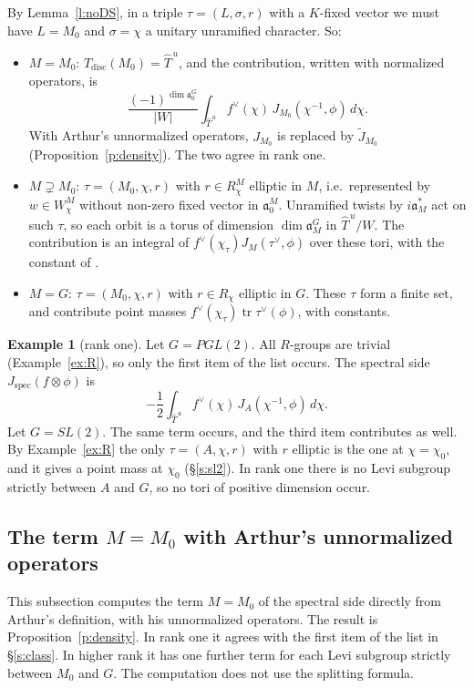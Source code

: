 \documentclass[12pt,letterpaper]{article}
\numberwithin{equation}{section}
\theoremstyle{plain}
\theoremstyle{definition}
\newtheorem{example}[theorem]{Example}
\theoremstyle{remark}
\newcommand{\fa}{\mathfrak{a}}
\newcommand{\Thu}{\widehat{T}^{\,u}}
\DeclareMathOperator{\tr}{tr}
\newcommand{\Tdisc}{T_{\mathrm{disc}}}
\begin{document}
By Lemma~\ref{l:noDS}, in a triple $\tau=(L,\sigma,r)$ with a $K$-fixed vector we must have $L=M_0$ and $\sigma=\chi$ a unitary unramified character. So:
\begin{itemize}
\item $M=M_0$: $\Tdisc(M_0)=\Thu$, and the contribution, written with normalized operators, is
\[
\frac{(-1)^{\dim\fa_0^G}}{|W|}\int_{\Thu}f^\vee(\chi)\,J_{M_0}(\chi^{-1},\phi)\,d\chi.
\]
With Arthur's unnormalized operators, $J_{M_0}$ is replaced by $\widetilde J_{M_0}$ (Proposition~\ref{p:density}). The two agree in rank one.
\item $M\supsetneq M_0$: $\tau=(M_0,\chi,r)$ with $r\in R^M_\chi$ elliptic in $M$, i.e.\ represented by $w\in W^M_\chi$ without non-zero fixed vector in $\fa_0^M$. Unramified twists by $i\fa_M^*$ act on such $\tau$, so each orbit is a torus of dimension $\dim\fa_M^G$ in $\Thu/W$. The contribution is an integral of $f^\vee(\chi_\tau)J_M(\tau^\vee,\phi)$ over these tori, with the constant of \cite{Ar93}.
\item $M=G$: $\tau=(M_0,\chi,r)$ with $r\in R_\chi$ elliptic in $G$. These $\tau$ form a finite set, and contribute point masses $f^\vee(\chi_\tau)\tr\tau^\vee(\phi)$, with constants.
\end{itemize}

\begin{example}[rank one]\label{ex:spec}
Let $G=PGL(2)$. All $R$-groups are trivial (Example~\ref{ex:R}), so only the first item of the list occurs. The spectral side $J_{\mathrm{spec}}(f\otimes\phi)$ is
\[
-\frac12\int_{\Thu}f^\vee(\chi)\,J_A(\chi^{-1},\phi)\,d\chi.
\]
Let $G=SL(2)$. The same term occurs, and the third item contributes as well. By Example~\ref{ex:R} the only $\tau=(A,\chi,r)$ with $r$ elliptic is the one at $\chi=\chi_0$, and it gives a point mass at $\chi_0$ (\S\ref{s:sl2}). In rank one there is no Levi subgroup strictly between $A$ and $G$, so no tori of positive dimension occur.
\end{example}

\subsection{The term \texorpdfstring{$M=M_0$}{M=M0} with Arthur's unnormalized operators}\label{s:unnorm}

This subsection computes the term $M=M_0$ of the spectral side directly from Arthur's definition, with his unnormalized operators. The result is Proposition~\ref{p:density}. In rank one it agrees with the first item of the list in \S\ref{s:class}. In higher rank it has one further term for each Levi subgroup strictly between $M_0$ and $G$. The computation does not use the splitting formula.
\end{document}
